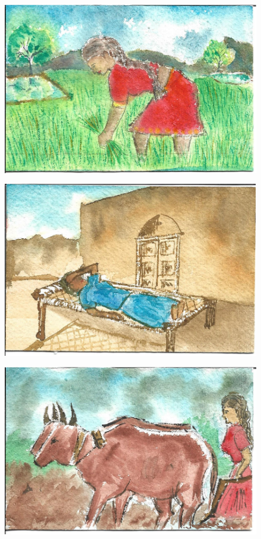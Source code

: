 \documentclass[12pt]{article}
\begin{document}
\begin{figure}[h!]
\centering
\includegraphics[width=.7\paperwidth]{pictures/AW}
\end{figure}

\newpage

\begin{figure}[h!]
\centering
\includegraphics[width=.7\paperwidth]{pictures/LR}
\end{figure}

\newpage

\begin{figure}[h!]
\centering
\includegraphics[width=.7\paperwidth]{pictures/AP}
\end{figure}
\end{document}
